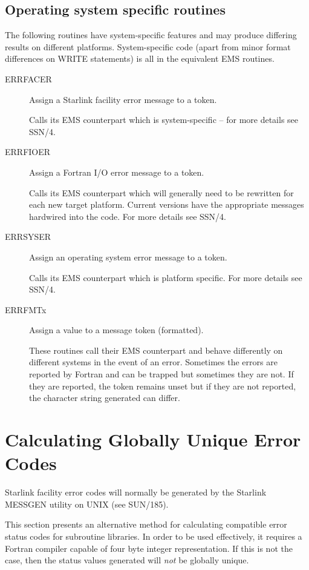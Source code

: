 \documentclass[twoside,11pt]{article}
\newcommand{\latex}[1]{#1}
\newcommand{\xref}[3]{#1}
\newcommand{\xlabel}[1]{}
\renewcommand{\_}{\texttt{\symbol{95}}}
\begin{document}
\subsection{\xlabel{operating_system_specific_routines}Operating system specific routines \label{dep_sect}}
The following routines have system-specific features and may produce differing
results on different platforms. System-specific code (apart from minor format
differences on WRITE statements) is all in the equivalent EMS routines.
\begin{description}
\item [ERR\_FACER] Assign a Starlink facility error message to a token.

Calls its EMS counterpart which is system-specific -- for more details see 
\xref{SSN/4}{ssn4}{operating_system_specific_routines}.
\item [ERR\_FIOER] Assign a Fortran I/O error message to a token.

Calls its EMS counterpart which will generally need to be rewritten for each 
new target platform.
Current versions have the appropriate messages hardwired into the code.
For more details see \xref{SSN/4}{ssn4}{operating_system_specific_routines}.
\item [ERR\_SYSER] Assign an operating system error message to a token.

Calls its EMS counterpart which is platform specific.
For more details see \xref{SSN/4}{ssn4}{operating_system_specific_routines}.
\item [ERR\_FMTx] Assign a value to a message token (formatted).

These routines call their EMS counterpart and behave differently on different 
systems in the event of an error. 
Sometimes the errors are reported by Fortran and can be trapped but 
sometimes they are not. If they are reported, the token remains unset but
if they are not reported, the character string generated can differ.
\end {description}

\section{\xlabel{calculating_globally_unique_error_codes}Calculating Globally Unique Error Codes \label{stat_sect}}
Starlink facility error codes will normally be generated by the Starlink
\xref{MESSGEN}{sun185}{} utility on UNIX\latex{ (see SUN/185)}.

This section presents an alternative method for calculating compatible
error status codes for subroutine libraries.
In order to be used effectively, it requires a Fortran compiler capable of four
byte integer representation.
If this is not the case, then the status values generated will \emph{not} be
globally unique.
\end{document}

